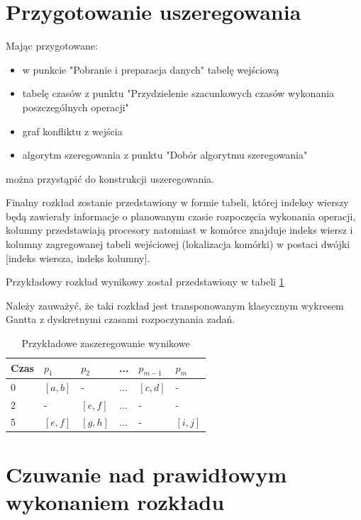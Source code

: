 \documentclass[brudnopis]{xmgr}
\begin{document}
\section{Przygotowanie uszeregowania}

Mając przygotowane:

\begin{itemize}
    \item w punkcie "Pobranie i preparacja danych" tabelę wejściową
    \item tabelę czasów z punktu "Przydzielenie szacunkowych czasów wykonania poszczególnych operacji"
    \item graf konfliktu z wejścia
    \item algorytm szeregowania z punktu "Dobór algorytmu szeregowania"
\end{itemize}

można przystąpić do konstrukcji uszeregowania.

Finalny rozkład zostanie przedstawiony w formie tabeli, której indeksy wierszy będą zawierały informacje o planowanym czasie rozpoczęcia wykonania operacji, kolumny przedstawiają procesory natomiast w komórce znajduje indeks wiersz i kolumny zagregowanej tabeli wejściowej (lokalizacja komórki) w postaci dwójki [indeks wiersza, indeks kolumny]. 

Przykładowy rozkład wynikowy został przedstawiony w tabeli \ref{tab:example-sched-out}

Należy zauważyć, że taki rozkład jest transponowanym klasycznym wykresem Gantta z dyskretnymi czasami rozpoczynania zadań.

\begin{table}[!tbh]
\begin{tabular}{|l|l|l|l|l|l|} \hline
Czas & $p_1$ & $p_2$ & ... & $p_{m-1}$ & $p_{m}$ \\ \hline
0 & $[a,b]$ & - & ... & $[c,d]$ & - \\ \hline
2 & - & $[e,f]$ & ... & - & - \\ \hline
5 & $[e,f]$ & $[g,h]$ & ... & - & $[i,j]$\\ \hline
\end{tabular}
\caption{Przykładowe zaszeregowanie wynikowe\label{tab:example-sched-out}}
\end{table}


\section{Czuwanie nad prawidłowym wykonaniem rozkładu}
\end{document}
